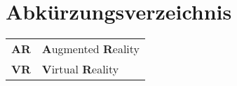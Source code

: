 \chapter{Abkürzungsverzeichnis}

\begin{center}
\begin{tabular}{rl}
\textbf{AR} & \textbf{A}ugmented \textbf{R}eality \\ 
\textbf{VR} & \textbf{V}irtual \textbf{R}eality \\ 
\end{tabular}
\end{center}
 